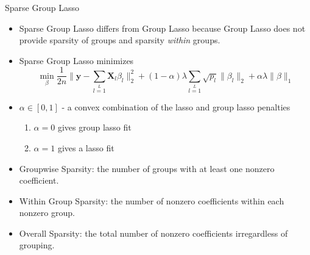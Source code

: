\documentclass[8pt]{beamer}
\begin{document}
\begin{frame}{Sparse Group Lasso}
\begin{itemize}
    \item Sparse Group Lasso differs from Group Lasso because Group Lasso does not provide sparsity of groups and sparsity \emph{within} groups.
    \item Sparse Group Lasso minimizes
    \[
    \min\limits_{\beta} \frac{1}{2n}
    \|\mathbf{y}-\sum\limits_{l=1}\limits^{L} \mathbf{X}_{l}\beta_{l}\|_{2}^{2} +(1-\alpha)\lambda \sum\limits_{l=1}\limits^{L}\sqrt{p_{l}} \|\beta_{l}\|_{2} +
    \alpha \lambda \|\beta\|_{1}
    \]
    \item $\alpha \in [0,1]$ -  a convex combination of the lasso and group lasso penalties
        \begin{enumerate}
            \item $\alpha = 0$ gives group lasso fit
            \item $\alpha = 1$ gives a lasso fit
        \end{enumerate}
    \item Groupwise Sparsity: the number of groups with at least one nonzero coefficient.
    \item Within Group Sparsity: the number of nonzero coefficients within each nonzero group.
    \item Overall Sparsity: the total number of nonzero coefficients irregardless of grouping.
   
\end{itemize}
\end{frame}
\end{document}
